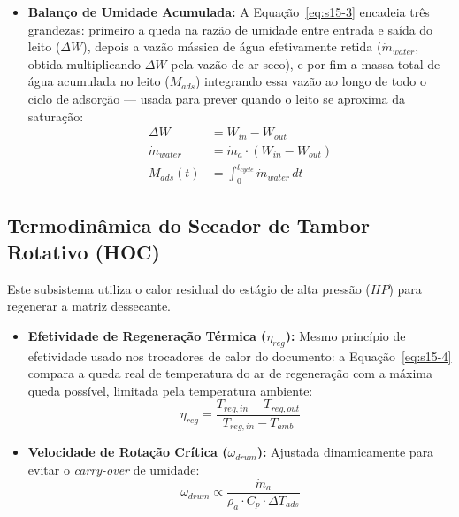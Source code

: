 \documentclass[12pt,a4paper]{article}
\numberwithin{equation}{section}
\numberwithin{table}{section}
\numberwithin{figure}{section}
\begin{document}
\begin{itemize}
			\item \textbf{Balanço de Umidade Acumulada:} A Equação~\eqref{eq:s15-3} encadeia três grandezas: primeiro a queda na razão de umidade entre entrada e saída do leito ($\Delta W$), depois a vazão mássica de água efetivamente retida ($\dot{m}_{water}$, obtida multiplicando $\Delta W$ pela vazão de ar seco), e por fim a massa total de água acumulada no leito ($M_{ads}$) integrando essa vazão ao longo de todo o ciclo de adsorção — usada para prever quando o leito se aproxima da saturação:
			\begin{equation}\label{eq:s15-3}
			\begin{aligned}
				\Delta W &= W_{in} - W_{out} \\[4pt]
				\dot{m}_{water} &= \dot{m}_a \cdot (W_{in} - W_{out}) \\[4pt]
				M_{ads}(t) &= \int_0^{t_{cycle}} \dot{m}_{water} \, dt
			\end{aligned}
\end{equation}
		\end{itemize}
		
		\subsection{\textbf{Termodinâmica do Secador de Tambor Rotativo (HOC)}}
		
		Este subsistema utiliza o calor residual do estágio de alta pressão ($HP$) para regenerar a matriz dessecante.
		
		\begin{itemize}
			\item \textbf{Efetividade de Regeneração Térmica ($\eta_{reg}$):} Mesmo princípio de efetividade usado nos trocadores de calor do documento: a Equação~\eqref{eq:s15-4} compara a queda real de temperatura do ar de regeneração com a máxima queda possível, limitada pela temperatura ambiente:
			\begin{equation}\label{eq:s15-4}
\eta_{reg} = \frac{T_{reg,in} - T_{reg,out}}{T_{reg,in} - T_{amb}}
\end{equation}
			
			\item \textbf{Velocidade de Rotação Crítica ($\omega_{drum}$):}
			Ajustada dinamicamente para evitar o \textit{carry-over} de umidade:
			\begin{equation}\label{eq:s15-5}
\omega_{drum} \propto \frac{\dot{m}_a}{\rho_a \cdot C_p \cdot \Delta T_{ads}}
\end{equation}
		\end{itemize}
\end{document}
